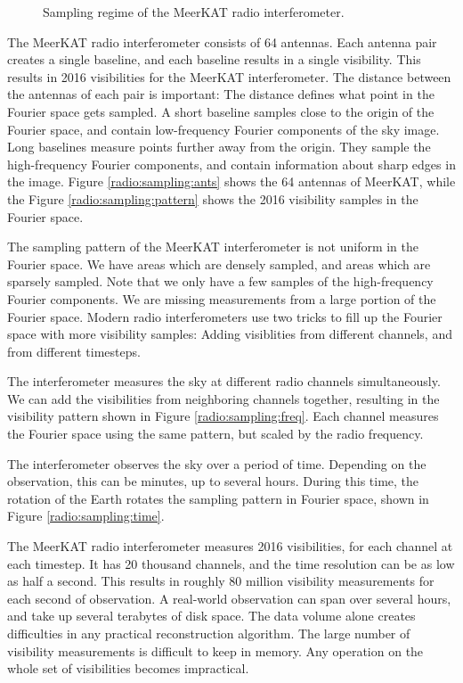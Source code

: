 \begin{figure}[!h]
	\caption{Sampling regime of the MeerKAT radio interferometer.}
	\label{intro:sampling}
\end{figure}


The MeerKAT radio interferometer consists of 64 antennas. Each antenna pair creates a single baseline, and each baseline results in a single visibility. This results in 2016 visibilities for the MeerKAT interferometer. The distance between the antennas of each pair is important: The distance defines what point in the Fourier space gets sampled. A short baseline samples close to the origin of the Fourier space, and contain low-frequency Fourier components of the sky image. Long baselines measure points further away from the origin. They sample the high-frequency Fourier components, and contain information about sharp edges in the image. Figure \ref{radio:sampling:ants} shows the 64 antennas of MeerKAT, while the Figure \ref{radio:sampling:pattern} shows the 2016 visibility samples in the Fourier space.


The sampling pattern of the MeerKAT interferometer is not uniform in the Fourier space. We have areas which are densely sampled, and areas which are sparsely sampled. Note that we only have a few samples of the high-frequency Fourier components. We are missing measurements from a large portion of the Fourier space. Modern radio interferometers use two tricks to fill up the Fourier space with more visibility samples: Adding visiblities from different channels, and from different timesteps.

The interferometer measures the sky at different radio channels simultaneously. We can add the visibilities from neighboring channels together, resulting in the visibility pattern shown in Figure \ref{radio:sampling:freq}. Each channel measures the Fourier space using the same pattern, but scaled by the radio frequency.

The interferometer observes the sky over a period of time. Depending on the observation, this can be minutes, up to several hours. During this time, the rotation of the Earth rotates the sampling pattern in Fourier space, shown in Figure \ref{radio:sampling:time}.

The MeerKAT radio interferometer measures 2016 visibilities, for each channel at each timestep. It has 20 thousand channels, and the time resolution can be as low as half a second. This results in roughly 80 million visibility measurements for each second of observation. A real-world observation can span over several hours, and take up several terabytes of disk space. The data volume alone creates difficulties in any practical reconstruction algorithm. The large number of visibility measurements is difficult to keep in memory. Any operation on the whole set of visibilities becomes impractical.

